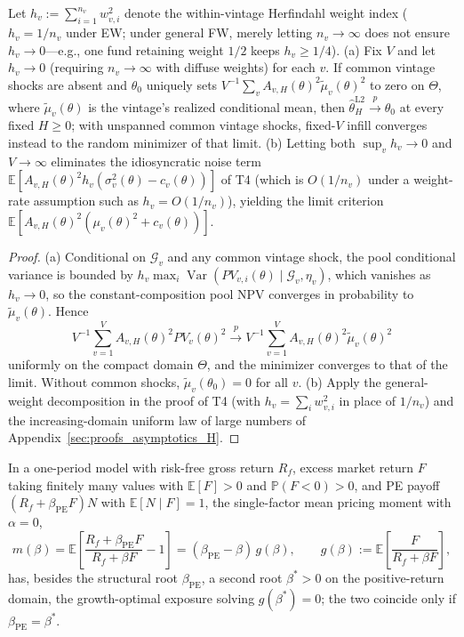 \begin{lemma}
\label{lem:infill}
Let $h_v := \sum_{i=1}^{n_v} w_{v,i}^2$ denote the within-vintage Herfindahl weight index ($h_v = 1/n_v$ under EW; under general FW, merely letting $n_v \to \infty$ does not ensure $h_v \to 0$---e.g., one fund retaining weight $1/2$ keeps $h_v \ge 1/4$).
(a) Fix $V$ and let $h_v \to 0$ (requiring $n_v \to \infty$ with diffuse weights) for each $v$. If common vintage shocks are absent and $\theta_0$ uniquely sets $V^{-1}\sum_v A_{v,H}(\theta)^2\tilde\mu_v(\theta)^2$ to zero on $\Theta$, where $\tilde\mu_v(\theta)$ is the vintage's realized conditional mean, then $\hat\theta_H^{\mathrm{L2}} \xrightarrow{p} \theta_0$ at every fixed $H \ge 0$; with unspanned common vintage shocks, fixed-$V$ infill converges instead to the random minimizer of that limit.
(b) Letting both $\sup_v h_v \to 0$ and $V \to \infty$ eliminates the idiosyncratic noise term $\mathbb{E}[A_{v,H}(\theta)^2 h_v (\sigma_v^2(\theta) - c_v(\theta))]$ of T4 (which is $O(1/n_v)$ under a weight-rate assumption such as $h_v = O(1/n_v)$), yielding the limit criterion $\mathbb{E}[A_{v,H}(\theta)^2(\mu_v(\theta)^2 + c_v(\theta))]$.
\end{lemma}

\begin{proof}
(a) Conditional on $\mathcal{G}_v$ and any common vintage shock, the pool conditional variance is bounded by $h_v \max_i \operatorname{Var}(PV_{v,i}(\theta)\mid \mathcal{G}_v, \eta_v)$, which vanishes as $h_v \to 0$, so the constant-composition pool NPV converges in probability to $\tilde\mu_v(\theta)$. Hence
\[
V^{-1}\sum_{v=1}^V A_{v,H}(\theta)^2 PV_v(\theta)^2 \xrightarrow{p} V^{-1}\sum_{v=1}^V A_{v,H}(\theta)^2 \tilde\mu_v(\theta)^2
\]
uniformly on the compact domain $\Theta$, and the minimizer converges to that of the limit. Without common shocks, $\tilde\mu_v(\theta_0) = 0$ for all $v$. (b) Apply the general-weight decomposition in the proof of T4 (with $h_v = \sum_i w_{v,i}^2$ in place of $1/n_v$) and the increasing-domain uniform law of large numbers of Appendix~\ref{sec:proofs_asymptotics_H}.
\end{proof}

\begin{lemma}
\label{lem:multiple_roots}
In a one-period model with risk-free gross return $R_f$, excess market return $F$ taking finitely many values with $\mathbb{E}[F] > 0$ and $\mathbb{P}(F < 0) > 0$, and PE payoff $(R_f + \beta_{\mathrm{PE}} F)N$ with $\mathbb{E}[N\mid F] = 1$, the single-factor mean pricing moment with $\alpha = 0$,
\[
m(\beta) = \mathbb{E}\!\left[\frac{R_f + \beta_{\mathrm{PE}} F}{R_f + \beta F} - 1\right]
= (\beta_{\mathrm{PE}} - \beta)\,g(\beta),
\qquad g(\beta) := \mathbb{E}\!\left[\frac{F}{R_f + \beta F}\right],
\]
has, besides the structural root $\beta_{\mathrm{PE}}$, a second root $\beta^\ast > 0$ on the positive-return domain, the growth-optimal exposure solving $g(\beta^\ast) = 0$; the two coincide only if $\beta_{\mathrm{PE}} = \beta^\ast$.
\end{lemma}

